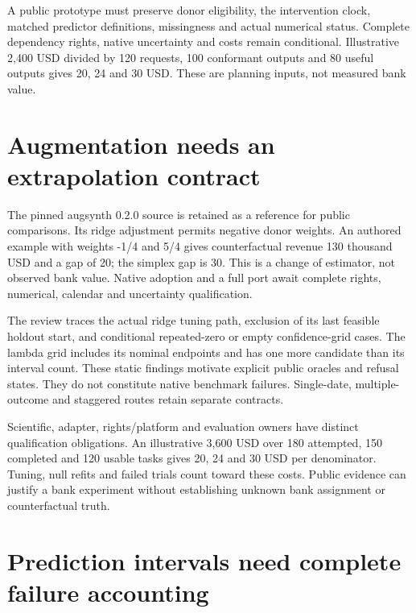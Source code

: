 A public prototype must preserve donor eligibility, the intervention
clock, matched predictor definitions, missingness and actual numerical
status. Complete dependency rights, native uncertainty and costs remain
conditional. Illustrative 2,400 USD divided by 120 requests, 100
conformant outputs and 80 useful outputs gives 20, 24 and 30 USD. These
are planning inputs, not measured bank value.
\citep{exec24_synth_choice}

\hypertarget{augmentation-needs-an-extrapolation-contract}{%
\section{Augmentation needs an extrapolation
contract}\label{augmentation-needs-an-extrapolation-contract}}

The pinned augsynth 0.2.0 source is retained as a reference for public
comparisons. Its ridge adjustment permits negative donor weights. An
authored example with weights -1/4 and 5/4 gives counterfactual revenue
130 thousand USD and a gap of 20; the simplex gap is 30. This is a
change of estimator, not observed bank value. Native adoption and a full
port await complete rights, numerical, calendar and uncertainty
qualification. \citep{exec24_augsynth_source,exec24_augsynth_choice}

The review traces the actual ridge tuning path, exclusion of its last
feasible holdout start, and conditional repeated-zero or empty
confidence-grid cases. The lambda grid includes its nominal endpoints
and has one more candidate than its interval count. These static
findings motivate explicit public oracles and refusal states. They do
not constitute native benchmark failures. Single-date, multiple-outcome
and staggered routes retain separate contracts.
\citep{exec24_augsynth_source}

Scientific, adapter, rights/platform and evaluation owners have distinct
qualification obligations. An illustrative 3,600 USD over 180 attempted,
150 completed and 120 usable tasks gives 20, 24 and 30 USD per
denominator. Tuning, null refits and failed trials count toward these
costs. Public evidence can justify a bank experiment without
establishing unknown bank assignment or counterfactual truth.
\citep{exec24_augsynth_choice}

\hypertarget{prediction-intervals-need-complete-failure-accounting}{%
\section{Prediction intervals need complete failure
accounting}\label{prediction-intervals-need-complete-failure-accounting}}


